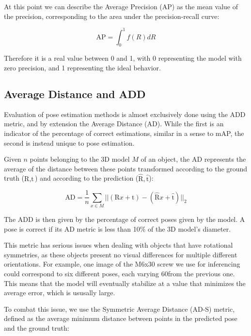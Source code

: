At this point we can describe the Average Precision (AP) as the mean value of the precision, corresponding to the area under the precision-recall curve:

\begin{equation*}
    \text{AP} = \int_{0}^{1} f(R)dR
\end{equation*}

Therefore it is a real value between 0 and 1, with 0 representing the model with zero precision, and 1 representing the ideal behavior.

\subsection{Average Distance and ADD}
\label{add_description}

Evaluation of pose estimation methods is almost exclusively done using the ADD metric, and by extension the Average Distance (AD). While the first is an indicator of the percentage of correct estimations, similar in a sense to mAP, the second is instead unique to pose estimation.

Given $n$ points belonging to the 3D model $M$ of an object, the AD represents the average of the distance between these points transformed according to the ground truth ($\text{R}, \text{t}$) and according to the prediction ($\hat{\text{R}}, \hat{\text{t}}$):

\begin{equation*}
    \text{AD} = \frac{1}{n} \sum_{x \in M} ||(\text{R}x + \text{t}) - 
    (\hat{\text{R}}x + \hat{\text{t}})||_2
\end{equation*}

The ADD is then given by the percentage of correct poses given by the model. A pose is correct if its AD metric is less than 10\% of the 3D model's diameter.

This metric has serious issues when dealing with objects that have rotational symmetries, as these objects present no visual differences for multiple different orientations. For example, one image of the M6x30 screw we use for inferencing could correspond to six different poses, each varying 60\degree from the previous one. This means that the model will eventually stabilize at a value that minimizes the average error, which is ususally large.

To combat this issue, we use the Symmetric Average Distance (AD-S)\cite{PoseCNN} metric, defined as the average minimum distance between points in the predicted pose and the ground truth:

